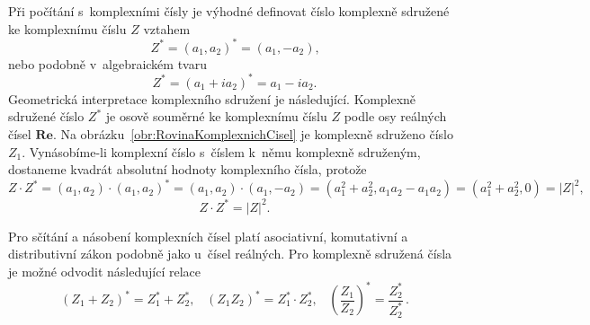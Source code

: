 Při počítání s~komplexními čísly je výhodné definovat číslo komplexně sdružené ke komplexnímu číslu $Z$ vztahem
\begin{equation}
Z^\ast = (a_1, a_2)^\ast = (a_1, -a_2) \mbox{,}
\label{rov:KomplexSdruzCislo-uspdvoj}
\end{equation}
nebo podobně v~algebraickém tvaru
\begin{equation}
Z^\ast = (a_1 + ia_2)^\ast = a_1 - ia_2 \mbox{.}
\end{equation}
Geometrická interpretace komplexního sdružení je následující. Komplexně sdružené číslo $Z^\ast$ je osově souměrné ke komplexnímu číslu $Z$ podle osy reálných čísel $\mathbf{Re}$. Na obrázku~\ref{obr:RovinaKomplexnichCisel} je komplexně sdruženo číslo $Z_1$. Vynásobíme-li komplexní číslo s~číslem k~němu komplexně sdruženým, dostaneme kvadrát absolutní hodnoty komplexního čísla, protože
\begin{displaymath}
Z \cdot Z^\ast = (a_1, a_2) \cdot (a_1, a_2)^\ast = (a_1, a_2) \cdot (a_1, -a_2) = (a_1^2 + a_2^2, a_1a_2 - a_1a_2) = (a_1^2 + a_2^2, 0) = |Z|^2 \mbox{,}
\end{displaymath}
\begin{equation}
Z \cdot Z^\ast = |Z|^2 \mbox{.}
\label{rov:KvadradAbsolutniHodnoty}
\end{equation}

Pro sčítání a násobení komplexních čísel platí asociativní, komutativní a distributivní zákon podobně jako u~čísel reálných. Pro komplexně sdružená čísla je možné odvodit následující relace
\begin{equation}
(Z_1 + Z_2)^\ast = Z_1^\ast + Z_2^\ast \mbox{,} \quad (Z_1Z_2)^\ast = Z_1^\ast \cdot Z_2^\ast \mbox{,} \quad \left(\frac{Z_1}{Z_2}\right)^\ast = \frac{Z_2^\ast}{Z_2^\ast} \,\mbox{.}
\label{rov:OperaceSdruzCisla}
\end{equation}

